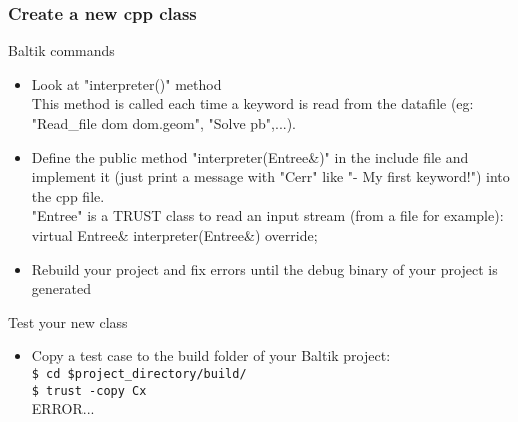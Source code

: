 \documentclass[10pt, hyperref={unicode=true,pdfusetitle, bookmarks=true,bookmarksnumbered=false,bookmarksopen=false, breaklinks=false,pdfborder={0 0 1},backref=true,colorlinks=true,linkcolor=darkblue,pageanchor, urlcolor=darkblue}]{beamer}
\begin{document}
\begin{frame}
\frametitle{Create a new cpp class}
\begin{block}{Baltik commands}

\begin{itemize}
\item Look at "interpreter()" method \\ %
 This method is called each time a keyword is read from the datafile (eg: "Read\_file dom dom.geom", "Solve pb",...).

\item Define the public method "interpreter(Entree\&)" in the include file and implement it
(just print a message with "Cerr" like "- My first keyword!") into the cpp file. \\
"Entree" is a TRUST class to read an input stream (from a file for example):\\
virtual Entree\& interpreter(Entree\&) override;

\item Rebuild your project and fix errors until the debug binary of your project is generated
\end{itemize}
\end{block}

\begin{block}{Test your new class}
\begin{itemize}
\item Copy a test case to the build folder of your Baltik project:\\
\texttt{\$ cd \$project\_directory/build/}\\
\texttt{\$ trust -copy Cx}\\
ERROR...

\end{itemize}
\end{block}
\end{frame}
\end{document}
